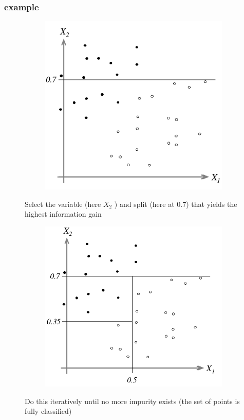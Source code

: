 \documentclass{beamer}
\begin{document}
\begin{frame}
\frametitle{example}
\begin{figure}
\centering
\begin{minipage}{.5\textwidth}
\begin{figure}
  \centering
  \includegraphics[width=.9\linewidth]{figures/04/01_classification/example_decision_3.png}
\end{figure}
Select the variable (here $X_2$ ) and
\newline
split (here at 0.7) that yields the
\newline
highest information gain
\end{minipage}%
\begin{minipage}{.5\textwidth}
\begin{figure}
  \centering
  \includegraphics[width=.9\linewidth]{figures/04/01_classification/example_decision_4.png}
\end{figure}
Do this iteratively until no more
impurity exists (the set of points
is fully classified)
\end{minipage}
\end{figure}
\end{frame}
\end{document}
